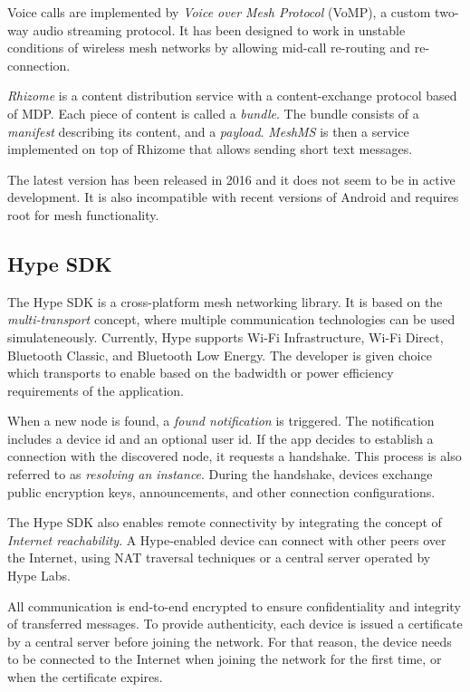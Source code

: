 \documentclass[conference,compsoc]{IEEEtran}
\begin{document}
Voice calls are implemented by \textit{Voice over Mesh Protocol} (VoMP), a custom two-way audio streaming protocol. It has been designed to work in unstable conditions of wireless mesh networks by allowing mid-call re-routing and re-connection.

\textit{Rhizome} is a content distribution service with a content-exchange protocol based of MDP. Each piece of content is called a \textit{bundle}. The bundle consists of a \textit{manifest} describing its content, and a \textit{payload}. \textit{MeshMS} is then a service implemented on top of Rhizome that allows sending short text messages.

The latest version has been released in 2016 and it does not seem to be in active development. It is also incompatible with recent versions of Android and requires root for mesh functionality.

\subsection{Hype SDK}
The Hype SDK \cite{hype} is a cross-platform mesh networking library. It is based on the \textit{multi-transport} concept, where multiple communication technologies can be used simulateneously. Currently, Hype supports Wi-Fi Infrastructure, Wi-Fi Direct, Bluetooth Classic, and Bluetooth Low Energy. The developer is given choice which transports to enable based on the badwidth or power efficiency requirements of the application.

When a new node is found, a \textit{found notification} is triggered. The notification includes a device id and an optional user id. If the app decides to establish a connection with the discovered node, it requests a handshake. This process is also referred to as \textit{resolving an instance}. During the handshake, devices exchange public encryption keys, announcements, and other connection configurations.

The Hype SDK also enables remote connectivity by integrating the concept of \textit{Internet reachability}. A Hype-enabled device can connect with other peers over the Internet, using NAT traversal techniques or a central server operated by Hype Labs.

All communication is end-to-end encrypted to ensure confidentiality and integrity of transferred messages. To provide authenticity, each device is issued a certificate by a central server before joining the network. For that reason, the device needs to be connected to the Internet when joining the network for the first time, or when the certificate expires.
\end{document}
